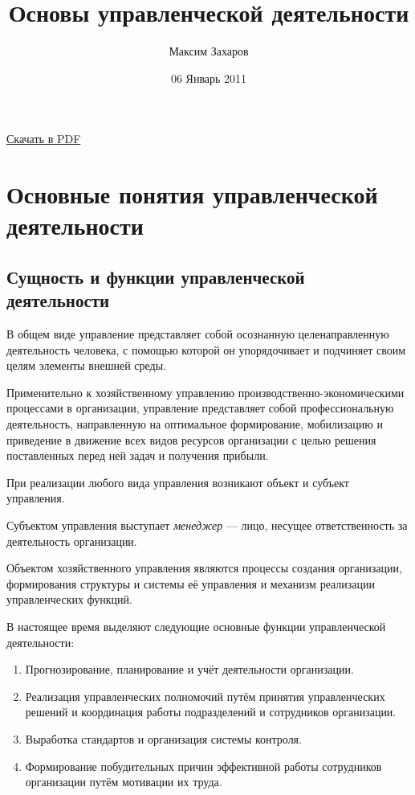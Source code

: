 \documentclass[12pt, russian, oneside, article]{ncc}
\begin{document}
\title{Основы управленческой деятельности}
\author{Максим Захаров}
\date{06 Январь 2011}
\maketitle

\setcounter{tocdepth}{3}
\tableofcontents
\vspace*{1cm}


\href{file:///home/maxim/Documents/Git/lectures/other/OUD_Lectures.pdf}{Скачать в PDF}

\section{Основные понятия управленческой деятельности}
\label{sec-1}
\subsection{Сущность и функции управленческой деятельности}
\label{sec-1_1}


В общем виде управление представляет собой осознанную целенаправленную деятельность человека, с помощью которой он упорядочивает и подчиняет своим целям элементы внешней среды.

Применительно к хозяйственному управлению производственно-экономическими процессами в организации, управление представляет собой профессиональную деятельность, направленную на оптимальное формирование, мобилизацию и приведение в движение всех видов ресурсов организации с целью решения поставленных перед ней задач и получения прибыли.

При реализации любого вида управления возникают объект и субъект управления.

Субъектом управления выступает \emph{менеджер} --- лицо, несущее ответственность за деятельность организации.

Объектом хозяйственного управления являются процессы создания организации, формирования структуры и системы её управления и механизм реализации управленческих функций.

В настоящее время выделяют следующие основные функции управленческой деятельности:
\begin{enumerate}
\item Прогнозирование, планирование и учёт деятельности организации.
\item Реализация управленческих полномочий путём принятия управленческих решений и координация работы подразделений и сотрудников организации.
\item Выработка стандартов и организация системы контроля.
\item Формирование побудительных причин эффективной работы сотрудников организации путём мотивации их труда.
\end{enumerate}
\end{document}
